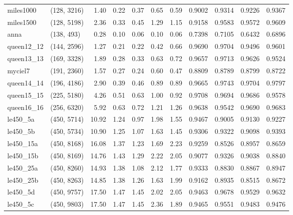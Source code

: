 \begin{tabular}{llrrrrrrrrr}
 miles1000 &  (128, 3216) &  1.40 & 0.22 & 0.37 &  0.65 &   0.59 &   0.9002 &   0.9314 &     0.9226 &      0.9367 \\
 miles1500 &  (128, 5198) &  2.36 & 0.33 & 0.45 &  1.29 &   1.15 &   0.9158 &   0.9583 &     0.9572 &      0.9609 \\
      anna &   (138, 493) &  0.28 & 0.10 & 0.06 &  0.10 &   0.06 &   0.7398 &   0.7105 &     0.6432 &      0.6896 \\
queen12\_12 &  (144, 2596) &  1.27 & 0.21 & 0.22 &  0.42 &   0.66 &   0.9690 &   0.9704 &     0.9496 &      0.9601 \\
queen13\_13 &  (169, 3328) &  1.89 & 0.28 & 0.33 &  0.63 &   0.72 &   0.9657 &   0.9713 &     0.9626 &      0.9524 \\
   myciel7 &  (191, 2360) &  1.57 & 0.27 & 0.24 &  0.60 &   0.47 &   0.8809 &   0.8789 &     0.8799 &      0.8722 \\
queen14\_14 &  (196, 4186) &  2.90 & 0.39 & 0.46 &  0.89 &   0.89 &   0.9665 &   0.9743 &     0.9704 &      0.9797 \\
queen15\_15 &  (225, 5180) &  4.26 & 0.51 & 0.63 &  1.00 &   0.92 &   0.9708 &   0.9694 &     0.9686 &      0.9578 \\
queen16\_16 &  (256, 6320) &  5.92 & 0.63 & 0.72 &  1.21 &   1.26 &   0.9638 &   0.9542 &     0.9690 &      0.9683 \\
  le450\_5a &  (450, 5714) & 10.92 & 1.24 & 0.97 &  1.98 &   1.55 &   0.9467 &   0.9005 &     0.9130 &      0.9227 \\
  le450\_5b &  (450, 5734) & 10.90 & 1.25 & 1.07 &  1.63 &   1.45 &   0.9306 &   0.9322 &     0.9098 &      0.9393 \\
 le450\_15a &  (450, 8168) & 16.08 & 1.37 & 1.23 &  1.69 &   2.23 &   0.9259 &   0.8526 &     0.8957 &      0.8659 \\
 le450\_15b &  (450, 8169) & 14.76 & 1.43 & 1.29 &  2.22 &   2.05 &   0.9077 &   0.9326 &     0.9038 &      0.8840 \\
 le450\_25a &  (450, 8260) & 14.93 & 1.38 & 1.08 &  2.12 &   1.77 &   0.9333 &   0.8830 &     0.8867 &      0.8947 \\
 le450\_25b &  (450, 8263) & 14.85 & 1.38 & 1.26 &  1.63 &   1.99 &   0.9162 &   0.8935 &     0.8515 &      0.8672 \\
  le450\_5d &  (450, 9757) & 17.50 & 1.47 & 1.45 &  2.02 &   2.05 &   0.9463 &   0.9678 &     0.9529 &      0.9632 \\
  le450\_5c &  (450, 9803) & 17.50 & 1.47 & 1.45 &  2.36 &   1.89 &   0.9465 &   0.9551 &     0.9483 &      0.9476 \\

\end{tabular}

